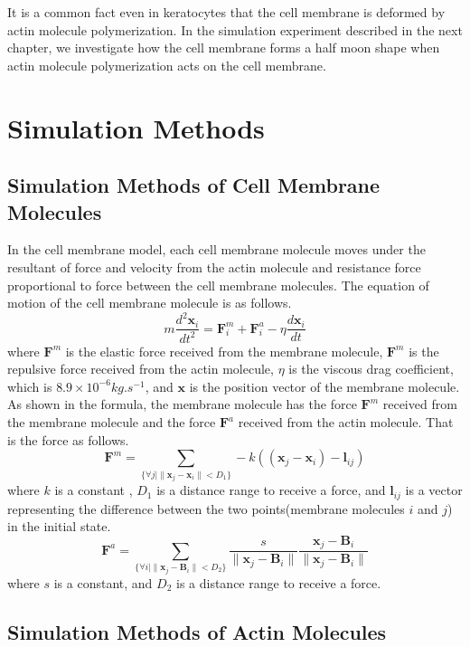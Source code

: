 \documentclass[a4paper,12pt]{book}
\begin{document}
It is a common fact even in keratocytes that the cell membrane is deformed by actin molecule polymerization. In the simulation experiment described in the next chapter, we investigate how the cell membrane forms a half moon shape when actin molecule polymerization acts on the cell membrane.


\chapter{Simulation Methods}
\section{Simulation Methods of Cell Membrane Molecules}
In the cell membrane model, each cell membrane molecule moves under the resultant of force and velocity from the actin molecule and resistance force proportional to force between the cell membrane molecules. The equation of motion of the cell membrane molecule is as follows.
\begin{equation}
m\frac{d^2\bm{x}_i}{dt^2} = \bm{F}^m_i +  \bm{F}^a_i - \eta \frac{d\bm{x}_i}{dt}
\end{equation}
where  $\bm{F}^m $ is the elastic force received from the membrane molecule,  $\bm{F}^m $ is the repulsive force received from the actin molecule, $\eta$ is the viscous drag coefficient, which is $8.9\times 10^{-6} \si{kg.s^{-1}}$, and $\bm{x}$ is the position vector of the membrane molecule. As shown in the formula, the membrane molecule has the force  $\bm{F}^m $ received from the membrane molecule and the force  $\bm{F}^a $ received from the actin molecule. That is the force as follows.
\begin{equation}
\bm{F}^m = \sum_{\{ \forall j | \| \bm{x}_j - \bm{x}_i \|<D_1\}} -k((\bm{x}_j -\bm{x}_i )-\bm{l}_{ij} )
\end{equation}
where $k$ is a constant , $D_1$ is a distance range to receive a force, and $\bm{l}_{ij}$ is a vector representing the difference between the two points(membrane molecules $i$ and $j$) in the initial state.
\begin{equation}
\bm{F}^a = \sum_{\{ \forall i | \| \bm{x}_j - \bm{B}_i \|<D_2\}} \frac{s}{\|\bm{x}_j -\bm{B}_i \|} \frac{\bm{x}_j -\bm{B}_i }{\|\bm{x}_j -\bm{B}_i \|}
\end{equation}
where $s$ is a constant, and $D_2$ is a distance range to receive a force.


\section{Simulation Methods of Actin Molecules}
\end{document}
